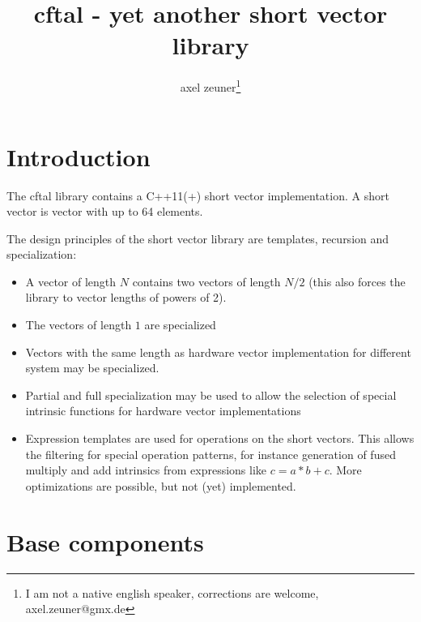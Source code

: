 \documentclass[10pt,a4paper,final,oneside]{article}
\numberwithin{equation}{subsection}
\begin{document}
\title{cftal - yet another short vector library}
\author{axel zeuner\footnote{I am not a native english speaker, corrections are welcome, axel.zeuner@gmx.de}}
\maketitle
\setcounter{tocdepth}{4}
\setcounter{secnumdepth}{3}

\tableofcontents

\section{Introduction}
\label{sec:introduction}

The cftal library contains a C++11(+) short vector implementation. A
short vector is vector with up to 64 elements.

The design principles of the short vector library are
templates, recursion and specialization:
\begin{itemize}
\item A vector of length $N$ contains two vectors of length $N/2$
  (this also forces the library to vector lengths of powers of 2).
\item The vectors of length $1$ are specialized
\item Vectors with the same length as hardware vector implementation
  for different system may be specialized.
\item Partial and full specialization may be used to allow the
  selection of special intrinsic functions for hardware vector
  implementations
\item Expression templates are used for operations on the short
  vectors. This allows the filtering for special operation patterns,
  for instance generation of fused multiply and add intrinsics from
  expressions like $ c= a* b + c $. More optimizations are possible,
  but not (yet) implemented.
\end{itemize}

\section{Base components}
\label{sec:base}
\end{document}
